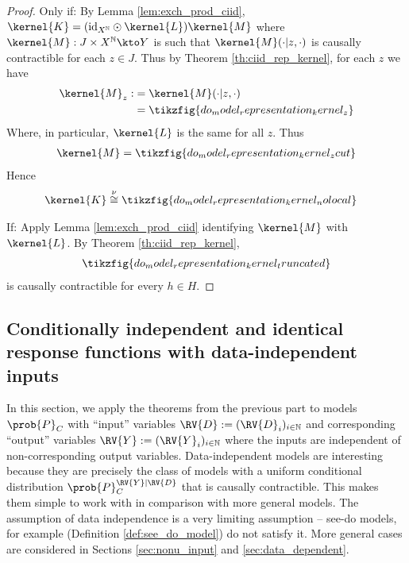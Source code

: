 \begin{proof}
Only if:
By Lemma \ref{lem:exch_prod_ciid}, $\kernel{K}=(\mathrm{id}_{X^{\mathbb{N}}}\odot \kernel{L})\kernel{M}$ where $\kernel{M}:J\times X^{\mathbb{N}}\kto Y$ is such that $\kernel{M}(\cdot|z,\cdot)$ is causally contractible for each $z\in J$. Thus by Theorem \ref{th:ciid_rep_kernel}, for each $z$ we have
\begin{align}
    \kernel{M}_z:&=\kernel{M}(\cdot|z,\cdot)\\
      &= \tikzfig{do_model_representation_kernel_z}
\end{align}
Where, in particular, $\kernel{L}$ is the same for all $z$. Thus
\begin{align}
    \kernel{M} = \tikzfig{do_model_representation_kernel_zcut}
\end{align}
Hence
\begin{align}
    \kernel{K} &\overset{\nu}{\cong} \tikzfig{do_model_representation_kernel_nolocal}
\end{align}

If:
Apply Lemma \ref{lem:exch_prod_ciid} identifying $\kernel{M}$ with $\kernel{L}$. By Theorem \ref{th:ciid_rep_kernel},
\begin{align}
    \tikzfig{do_model_representation_kernel_truncated}
\end{align}
is causally contractible for every $h\in H$.
\end{proof}

\subsection[Data-independent inputs]{Conditionally independent and identical response functions with data-independent inputs}\label{sec:data_independent_actions}

In this section, we apply the theorems from the previous part to models $\prob{P}_C$ with ``input'' variables $\RV{D}:=(\RV{D}_i)_{i\in \mathbb{N}}$ and corresponding ``output'' variables $\RV{Y}:=(\RV{Y}_i)_{i\in \mathbb{N}}$ where the inputs are independent of non-corresponding output variables. Data-independent models are interesting because they are precisely the class of models with a uniform conditional distribution $\prob{P}_C^{\RV{Y}|\RV{D}}$ that is causally contractible. This makes them simple to work with in comparison with more general models. The assumption of data independence is a very limiting assumption -- see-do models, for example (Definition \ref{def:see_do_model}) do not satisfy it. More general cases are considered in Sections \ref{sec:nonu_input} and \ref{sec:data_dependent}.

